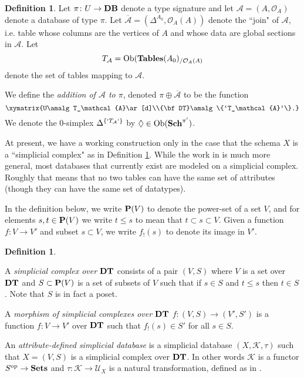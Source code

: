 \documentclass{amsart}
\def\tn{\textnormal}
\def\mc{\mathcal}
\def\Ob{\tn{Ob}}
\def\to{\rightarrow}
\def\taking{\colon}
\def\ss{\subset}
\def\op{^\tn{op}}
\def\ol{\overline}
\def\Sets{{\bf Sets}}
\def\mcA{\mc{A}}
\def\mcK{\mc{K}}
\def\mcO{\mc{O}}
\def\mcU{\mc{U}}
\theoremstyle{remark}
\theoremstyle{definition}
\newtheorem{definition}[theorem]{Definition}
\def\DT{{\bf DT}}
\def\DB{{\bf DB}}
\def\Tables{{\bf Tables}}
\def\Sch{{\bf Sch}}
\def\P{{\bf P}}
\begin{document}
\begin{definition}

Let $\pi\taking U\to\DB$ denote a type signature and let $\mcA=(A,\mcO_A)$ denote a database of type $\pi$.  Let $\ol{\mcA}=(\Delta^{A_0},\mcO_A(A))$ denote the ``join" of $\mcA$, i.e. table whose columns are the vertices of $A$ and whose data are global sections in $\mcA$.  Let $$T_\mcA=\Ob(\Tables(A_0)_{/\mcO_A(A)}$$ denote the set of tables mapping to $\mcA$.

We define the {\em addition of $\mcA$ to $\pi$}, denoted $\pi\oplus\ol{\mcA}$ to be the function $$\xymatrix{U\amalg T_\mcA\ar[d]\\\DT\amalg\{`T_\mcA`\}.}$$  We denote the 0-simplex $\Delta^{\{`T_\mcA`\}}$ by $\lozenge\in\Ob(\Sch^{\pi'})$.
 
\end{definition}

At present, we have a working construction only in the case that the schema $X$ is a ``simplicial complex" as in Definition \ref{def:simplicial complex}.  While the work in \cite{SD} is much more general, most databases that currently exist are modeled on a simplicial complex.  Roughly that means that no two tables can have the same set of attributes (though they can have the same set of datatypes).  

In the definition below, we write $\P(V)$ to denote the power-set of a set $V$, and for elements $s,t\in\P(V)$ we write $t\leq s$ to mean that $t\ss s\ss V$.  Given a function $f\taking V\to V'$ and subset $s\ss V$, we write $f_!(s)$ to denote its image in $V'$.

\begin{definition}\label{def:simplicial complex}

A {\em simplicial complex over $\DT$ } consists of a pair $(V,S)$ where $V$ is a set over $\DT$ and $S\ss\P(V)$ is a set of subsets of $V$ such that if $s\in S$ and $t\leq s$ then $t\in S$.  Note that $S$ is in fact a poset.

A {\em morphism of simplicial complexes over $\DT$} $f\taking (V,S)\to (V',S')$ is a function $f\taking V\to V'$ over $\DT$ such that $f_!(s)\in S'$ for all $s\in S$.  

An {\em attribute-defined simplicial database} is a simplicial database $(X,\mcK,\tau)$ such that $X=(V,S)$ is a simplicial complex over $\DT$.  In other words $\mcK$ is a functor $S\op\to\Sets$ and $\tau\taking\mcK\to\mcU_X$ is a natural transformation, defined as in \cite{SD}.

\end{definition}
\end{document}
